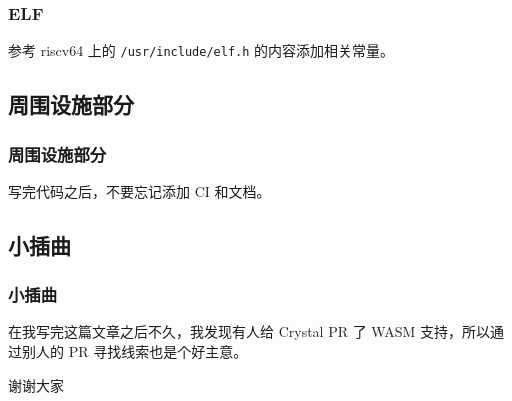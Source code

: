 \documentclass[UTF-8]{ctexbeamer}
\begin{document}
\begin{frame}[fragile]
	\frametitle{ELF}

	参考 riscv64 上的 \verb|/usr/include/elf.h| 的内容添加相关常量。

\end{frame}

\subsection{周围设施部分}
\begin{frame}
	\frametitle{周围设施部分}

	写完代码之后，不要忘记添加 CI 和文档。

\end{frame}

\subsection{小插曲}
\begin{frame}
	\frametitle{小插曲}

	在我写完这篇文章之后不久，我发现有人给 Crystal PR 了 WASM 支持，所以通过别人的 PR 寻找线索也是个好主意。

\end{frame}

\begin{frame}
	\begin{center}
		\huge{谢谢大家}
	\end{center}

\end{frame}
\end{document}
